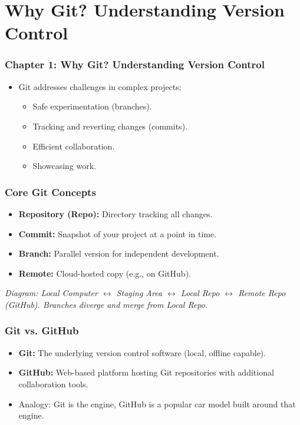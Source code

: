 \documentclass{beamer}
\begin{document}
\section{Why Git? Understanding Version Control}
\begin{frame}
  \frametitle{Chapter 1: Why Git? Understanding Version Control}
  \begin{itemize}
    \item Git addresses challenges in complex projects:
    \begin{itemize}
        \item Safe experimentation (branches).
        \item Tracking and reverting changes (commits).
        \item Efficient collaboration.
        \item Showcasing work.
    \end{itemize}
  \end{itemize}
\end{frame}

\begin{frame}
  \frametitle{Core Git Concepts}
  \begin{itemize}
    \item \textbf{Repository (Repo):} Directory tracking all changes.
    \item \textbf{Commit:} Snapshot of your project at a point in time.
    \item \textbf{Branch:} Parallel version for independent development.
    \item \textbf{Remote:} Cloud-hosted copy (e.g., on GitHub).
  \end{itemize}
  \vfill
  \textit{Diagram: Local Computer \(\leftrightarrow\) Staging Area \(\leftrightarrow\) Local Repo \(\leftrightarrow\) Remote Repo (GitHub). Branches diverge and merge from Local Repo.}
\end{frame}

\begin{frame}
  \frametitle{Git vs. GitHub}
  \begin{itemize}
    \item \textbf{Git:} The underlying version control software (local, offline capable).
    \item \textbf{GitHub:} Web-based platform hosting Git repositories with additional collaboration tools.
    \item Analogy: Git is the engine, GitHub is a popular car model built around that engine.
  \end{itemize}
\end{frame}
\end{document}
